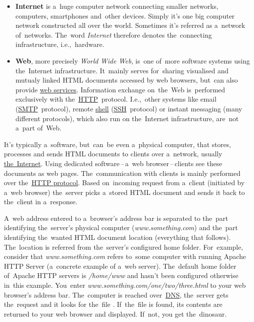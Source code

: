 \label{internetweb}
\begin{itemize}
    \item \textbf{Internet} is a~huge computer network connecting smaller networks, computers, smartphones and~other devices.
          Simply it's one big computer network constructed all over the world.
          Sometimes it's referred as a~network of~networks.
          The~word \textit{Internet} therefore denotes the~connecting infrastructure, i.e.,~hardware.
    \item \textbf{Web}, more precisely \textit{World Wide Web}, is~one of~more software systems using the~Internet infrastructure.
          It~mainly serves for~sharing visualised and mutualy linked HTML documents accessed by web browsers, but~can also provide \hyperref[webserviceapplication]{web services}.
          Information exchange on~the~Web is~performed exclusively with the~\hyperref[http]{HTTP}~protocol.
          I.e.,~other systems like email (\hyperref[smtp]{SMTP}~protocol), remote \hyperref[shellcligui]{shell} (\hyperref[ssh]{SSH}~protocol) or instant messaging (many different protocols), which also run on the~Internet infrastructure, are~not a~part of~Web.
\end{itemize}

\label{namespaces}

\label{webserver}
It's typically a~software, but~can~be even a~physical computer, that stores, processes and sends HTML documents to clients over a~network, usually \hyperref[internetweb]{the~Internet}.
Using dedicated software\,--\,a~web browser\,--\,clients see these documents as web pages.
The~communication with clients is mainly performed over the~\hyperref[http]{HTTP protocol}.
Based on~incoming request from a~client (initiated by a~web browser) the~server picks a~stored HTML document and sends it back to the~client in a~response.

A~web address entered to a~browser's address bar is separated to the~part identifying the~server's physical computer (\textit{www.something.com}) and the~part identifying the~wanted HTML document location (everything that follows).
The~location is referred from the~server's configured home folder.
For~example, consider that \textit{www.something.com} refers to~some computer with running Apache HTTP Server (a~concrete example of a~web server).
The~default home folder of~Apache HTTP servers is \textit{/home/www} and hasn't been configured otherwise in~this example.
You~enter \textit{www.something.com/one/two/three.html} to your web browser's address bar.
The~computer is reached over~\hyperref[dns]{DNS}, the~server gets the~request and it looks for the~file .
If~the~file is found, its contents are returned to your web browser and displayed.
If~not, you get the~dinosaur.

